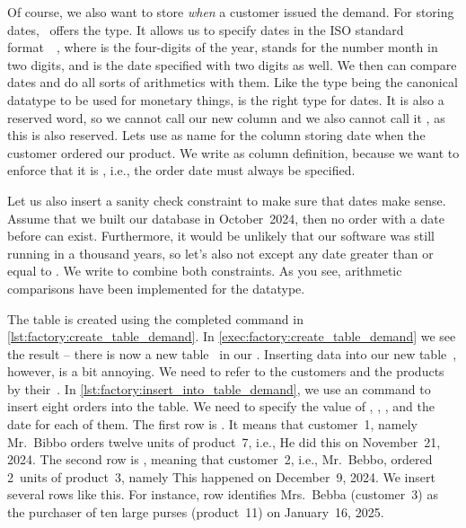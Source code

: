 Of course, we also want to store \emph{when} a customer issued the demand.
For storing dates, \sql\ offers the  type.
It allows us to specify dates in the ISO standard format~~\cite{ISO860112019}, where  is the four-digits of the year,  stands for the number month in two digits, and  is the date specified with two digits as well.
We then can compare dates and do all sorts of arithmetics with them.
Like the type  being the canonical datatype to be used for monetary things,  is the right type for dates.
It is also a reserved word, so we cannot call our new column  and we also cannot call it , as this is also reserved.
Lets use  as name for the column storing date when the customer ordered our product.
We write  as column definition, because we want to enforce that it is , i.e., the order date must always be specified.%
%
\begin{sloppypar}%
Let us also insert a sanity check constraint to make sure that dates make sense.
Assume that we built our database in October~2024, then no order with a date before  can exist.
Furthermore, it would be unlikely that our software was still running in a thousand years, so let's also not except any date greater than or equal to .
We write  to combine both constraints.
As you see, arithmetic comparisons have been implemented for the  datatype.%
\end{sloppypar}%
%
The table is created using the completed command in \cref{lst:factory:create_table_demand}.
In \cref{exec:factory:create_table_demand} we see the result -- there is now a new table~ in our \db.%
%
\endhsection%
%
%
%
%
Inserting data into our new table~, however, is a bit annoying.
We need to refer to the customers and the products by their~.
In \cref{lst:factory:insert_into_table_demand}, we use an  command to insert eight orders into the table.
We need to specify the value of , , , and the  date for each of them.
The first row is .
It means that customer~1, namely Mr.~Bibbo orders twelve units of product~7, i.e., 
He did this on November~21, 2024.
The second row is , meaning that customer~2, i.e., Mr.~Bebbo, ordered 2~units of product~3, namely 
This happened on December~9, 2024.
We insert several rows like this.
For instance, row  identifies Mrs.~Bebba (customer~3) as the purchaser of ten large purses (product~11) on January~16, 2025.

